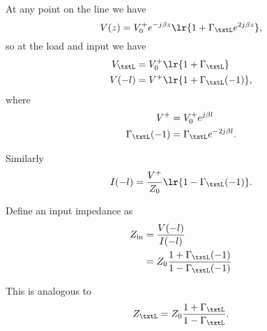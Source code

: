 At any point on the line we have
\begin{equation}\label{eqn:uwaves4TransmissionLinesCore:1320}
V(z) = V_0^{+} e^{-j \beta z} \lr{ 1 + \Gamma_\txtL e^{2 j \beta z} },
\end{equation}
so at the load and input we have
\begin{equation}\label{eqn:uwaves4TransmissionLinesCore:1340}
\begin{aligned}
V_\txtL &= V_0^{+} \lr{ 1 + \Gamma_\txtL } \\
V(-l) &= V^{+} \lr{ 1 + \Gamma_\txtL(-1) },
\end{aligned}
\end{equation}
where
\begin{equation}\label{eqn:uwaves4TransmissionLinesCore:1360}
\begin{aligned}
V^{+} &= V_0^{+} e^{ j \beta l } \\
\Gamma_\txtL(-1) &= \Gamma_\txtL e^{-2 j \beta l}.
\end{aligned}
\end{equation}

Similarly
\begin{equation}\label{eqn:uwaves4TransmissionLinesCore:1380}
I(-l) = \frac{V^{+}}{Z_0} \lr{ 1 - \Gamma_\txtL(-1) }.
\end{equation}

Define an input impedance as
\begin{equation}\label{eqn:uwaves4TransmissionLinesCore:1400}
\begin{aligned}
Z_{\textrm{in}}
&= \frac{V(-l)}{I(-l)}
\\ &= Z_0 \frac{1 + \Gamma_\txtL(-1)}{1 - \Gamma_\txtL(-1)}
\end{aligned}
\end{equation}

This is analogous to
\begin{equation}\label{eqn:uwaves4TransmissionLinesCore:1420}
Z_\txtL
= Z_0 \frac{1 + \Gamma_\txtL}{1 - \Gamma_\txtL}.
\end{equation}

